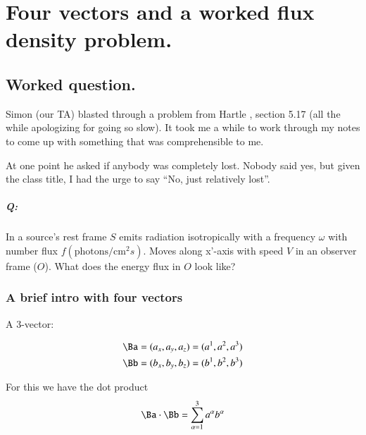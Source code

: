 %
%

\chapter{Four vectors and a worked flux density problem.}
\label{chap:relativisticElectrodynamicsT1}
{}
\date{Jan 20, 2011}

\beginArtNoToc

\section{Worked question.}

Simon (our TA) blasted through a problem from Hartle \citep{hartle2003gravity}, section 5.17 (all the while apologizing for going so slow).  It took me a while to work through my notes to come up with something that was comprehensible to me.

At one point he asked if anybody was completely lost.  Nobody said yes, but given the class title, I had the urge to say ``No, just relatively lost''.

\paragraph{Q:}
In a source's rest frame $S$ emits radiation isotropically with a frequency $\omega$ with number flux $f(\text{photons}/\text{cm}^2 s)$.  Moves along x'-axis with speed $V$ in an observer frame ($O$).  What does the energy flux in $O$ look like?

\subsection{A brief intro with four vectors}

A 3-vector: 

\begin{align}\label{eqn:relativisticElectrodynamicsT1:10}
\Ba &= (a_x, a_y, a_z) = (a^1, a^2, a^3) \\
\Bb &= (b_x, b_y, b_z) = (b^1, b^2, b^3)
\end{align}

For this we have the dot product
\begin{equation}\label{eqn:relativisticElectrodynamicsT1:20}
\Ba \cdot \Bb = \sum_{\alpha=1}^3 a^\alpha b^\alpha
\end{equation}

